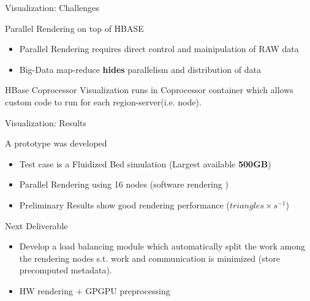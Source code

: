 \documentclass{beamer}
\begin{document}
  \begin{frame}{Visualization: Challenges}
		\begin{exampleblock}{Parallel Rendering on top of HBASE}
	\begin{itemize}
		\item Parallel Rendering requires direct control and mainipulation of RAW data
		\item Big-Data map-reduce \textbf{hides} parallelism and distribution of data
	\end{itemize}
	\end{exampleblock}
			
	\begin{alertblock}{HBase Coprocessor}
		Visualization runs in Coprocessor container which allows custom code to run for each region-server(i.e. node). 



	\end{alertblock}	
		

\end{frame} %

  \begin{frame}{Visualization: Results}
		\begin{exampleblock}{A prototype was developed}
	\begin{itemize}
		\item Test case is a Fluidized Bed simulation (Largest available \textbf{500GB})
		\item Parallel Rendering using 16 nodes (software rendering \Frowny{} ) 
		\item Preliminary Results show good rendering performance ($triangles \times s^{-1}$) 
	\end{itemize}
	\end{exampleblock}
			
	\begin{alertblock}{Next Deliverable}
	\begin{itemize}
		\item Develop a load balancing module which automatically split the work among the rendering nodes s.t. work and communication is minimized (store precomputed metadata).
		\item HW rendering + GPGPU preprocessing
		
	\end{itemize}



	\end{alertblock}	
		

\end{frame} %
\end{document}
